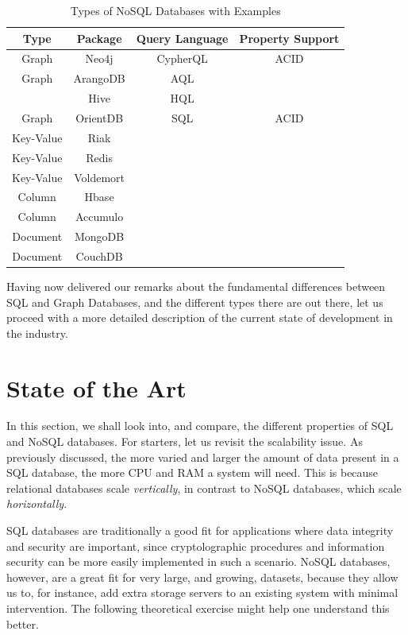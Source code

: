 \documentclass[10pt,        %
               a4paper,     %
               journal,     %
               ]{IEEEtran}
\begin{document}
\begin{table}[!t]
	\renewcommand{\arraystretch}{1.3} %
	\caption{Types of NoSQL Databases with Examples}
	\label{table_types_nosql}
	\centering
	\begin{tabular}{|c|c|c|c|}
		\hline
		Type & Package & Query Language & Property Support  \\
		\hline
		Graph & Neo4j & CypherQL & ACID \\
		\hline
		Graph & ArangoDB & AQL & \\
		\hline
		 & Hive & HQL & \\
		\hline
		Graph & OrientDB & SQL & ACID \\
		\hline
		Key-Value & Riak & &  \\
		\hline
		Key-Value & Redis & & \\
		\hline
		Key-Value & Voldemort & & \\
		\hline
		Column & Hbase & & \\
		\hline
		Column & Accumulo & & \\
		\hline
		Document & MongoDB & & \\
		\hline
		Document & CouchDB & & \\
		\hline
	\end{tabular}
\end{table}

Having now delivered our remarks about the fundamental differences between SQL and Graph Databases, and the different types there are out there, let us proceed with a more detailed description of the current state of development in the industry.

\section{State of the Art}
In this section, we shall look into, and compare, the different properties of SQL and NoSQL databases. For starters, let us revisit the scalability issue. As previously discussed, the more varied and larger the amount of data present in a SQL database, the more CPU and RAM a system will need. This is because relational databases scale \textit{vertically}, in contrast to NoSQL databases, which scale \textit{horizontally}. \par
SQL databases are traditionally a good fit for applications where data integrity and security are important, since cryptolographic procedures and information security can be more easily implemented in such a scenario. NoSQL databases, however, are a great fit for very large, and growing, datasets, because they allow us to, for instance, add extra storage servers to an existing system with minimal intervention. The following theoretical exercise might help one understand this better. \par
\end{document}
